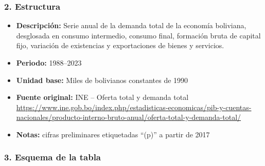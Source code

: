 \documentclass[12pt,a4paper]{article}
\begin{document}
\subsubsection*{2. Estructura}
\begin{itemize}
  \item \textbf{Descripción:} Serie anual de la demanda total de la economía boliviana, desglosada en consumo intermedio, consumo final, formación bruta de capital fijo, variación de existencias y exportaciones de bienes y servicios.
  \item \textbf{Periodo:} 1988–2023
  \item \textbf{Unidad base:} Miles de bolivianos constantes de 1990
  \item \textbf{Fuente original:} INE – Oferta total y demanda total\\
    \url{https://www.ine.gob.bo/index.php/estadisticas-economicas/pib-y-cuentas-nacionales/producto-interno-bruto-anual/oferta-total-y-demanda-total/}
  \item \textbf{Notas:} cifras preliminares etiquetadas “(p)” a partir de 2017
\end{itemize}

\subsubsection*{3. Esquema de la tabla}
\end{document}
